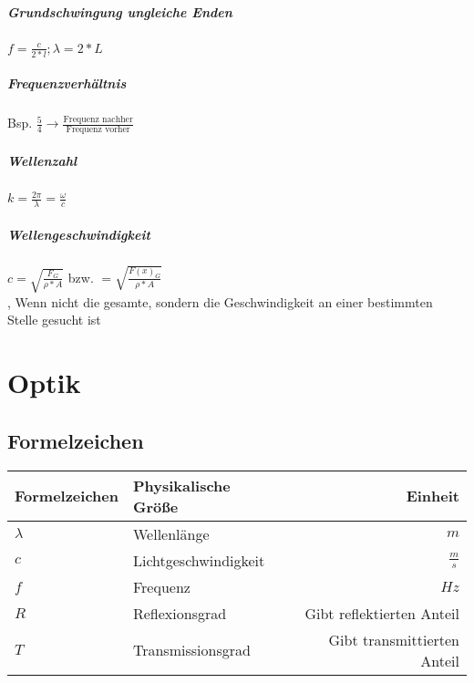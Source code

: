 \documentclass[a4paper, 12pt]{scrreprt}
\begin{document}
\paragraph{Grundschwingung ungleiche Enden} \dotfill \(f = \frac{c}{2*l} ; \lambda = 2 * L\)
\paragraph{Frequenzverhältnis} \dotfill Bsp. \(\frac{5}{4} \rightarrow \frac{\text{Frequenz nachher}}{\text{Frequenz vorher}}\)
\paragraph{Wellenzahl} \dotfill \(k = \frac{2\pi}{\lambda} = \frac{\omega}{c}\)
\paragraph{Wellengeschwindigkeit} \dotfill \(c = \sqrt{\frac{F_G}{\rho * A}}\) bzw. \(= \sqrt{\frac{F(x)_G}{\rho * A}}\)\\ , Wenn nicht die gesamte, sondern die Geschwindigkeit an einer bestimmten Stelle gesucht ist



\chapter{Optik}

\section{Formelzeichen}

\begin{center}
  \makegapedcells
  \begin{tabular}{l | l | r}
    Formelzeichen & Physikalische Größe & Einheit\\
    \hline \hline
    \(\lambda\) & Wellenlänge & \(m\)\\ \hline
    \(c\) & Lichtgeschwindigkeit & \(\frac{m}{s}\)\\ \hline
    \(f\) & Frequenz & \(Hz\)\\ \hline
    \(R\) & Reflexionsgrad & Gibt reflektierten Anteil\\ \hline
    \(T\) & Transmissionsgrad & Gibt transmittierten Anteil\\ \hline
  \end{tabular}
\end{center}
\end{document}
